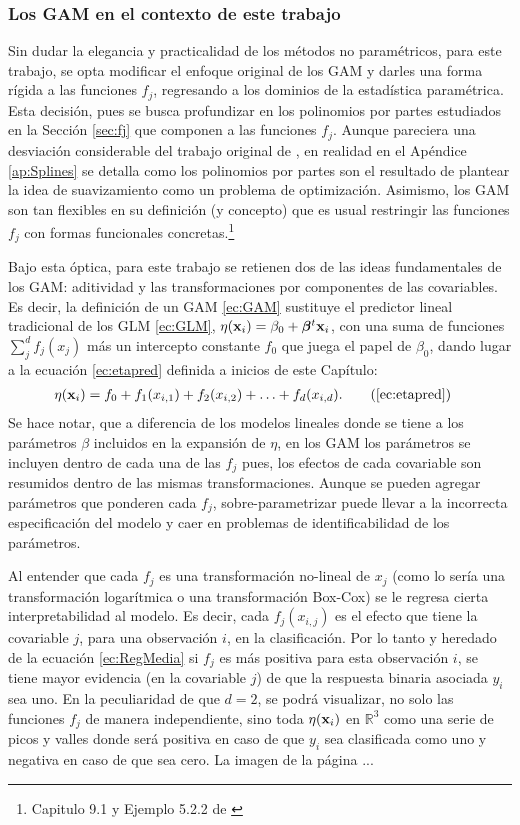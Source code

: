 \documentclass[../Main/Main.tex]{subfiles}
\begin{document}
\subsubsection*{Los GAM en el contexto de este trabajo}
Sin dudar la elegancia y practicalidad de los métodos no paramétricos, para este trabajo, se opta modificar el enfoque original de los GAM y darles una forma rígida a las funciones $f_j$, regresando a los dominios de la estadística paramétrica. Esta decisión, pues se busca profundizar en los polinomios por partes estudiados en la Sección \ref{sec:fj} que componen a las funciones $f_j$. Aunque pareciera una desviación considerable del trabajo original de \citeauthor{hastie1990generalized}, en realidad en el Apéndice \ref{ap:Splines} se detalla como los polinomios por partes son el resultado de plantear la idea de suavizamiento como un problema de optimización. Asimismo, los GAM son tan flexibles en su definición (y concepto) que es usual restringir las funciones $f_j$ con formas funcionales concretas.\footnote{Capitulo 9.1 y Ejemplo 5.2.2 de \citet{hastie2008elements}}

Bajo esta óptica, para este trabajo se retienen dos de las ideas fundamentales de los GAM: aditividad y las transformaciones por componentes de las covariables. Es decir, la definición de un GAM \eqref{ec:GAM} sustituye el predictor lineal tradicional de los GLM \eqref{ec:GLM}, $\eta(\mathbf{x}_i) = \beta_0 + \bm{\beta}^t\mathbf{x}_i$, con una suma de funciones $\sum_j^d f_j(x_j)$ más un intercepto constante $f_0$ que juega el papel de $\beta_0$, dando lugar a la ecuación \eqref{ec:etapred} definida a inicios de este Capítulo:
\begin{align}
\eta(\xni) &= f_0 + f_1(x_{i,1}) + f_2(x_{i,2}) + \ldots + f_d(x_{i,d}). \tag{\ref{ec:etapred}}
\end{align}
Se hace notar, que a diferencia de los modelos lineales donde se tiene a los parámetros $\beta$ incluidos en la expansión de $\eta$,  en los GAM los parámetros se incluyen dentro de cada una de las $f_j$ pues, los efectos de cada covariable son resumidos dentro de las mismas transformaciones. Aunque se pueden agregar parámetros que ponderen cada $f_j$, sobre-parametrizar puede llevar a la incorrecta especificación del modelo y caer en problemas de identificabilidad de los parámetros.

Al entender que cada $f_j$ es una transformación no-lineal de $x_j$ (como lo sería una transformación logarítmica o una transformación Box-Cox) se le regresa cierta interpretabilidad al modelo. Es decir, cada $f_j(x_{i,j})$ es el efecto que tiene la covariable $j$, para una observación $i$, en la clasificación. Por lo tanto y heredado de la ecuación \eqref{ec:RegMedia} si $f_j$ es más positiva para esta observación $i$, se tiene mayor evidencia (en la covariable $j$) de que la respuesta binaria asociada $y_i$ sea uno. En la peculiaridad de que $d = 2$, se podrá visualizar, no solo las funciones $f_j$ de manera independiente, sino toda $\eta(\mathbf{x}_i)$ en $\mathbb{R}^3$ como una serie de picos y valles donde será positiva en caso de que $y_i $ sea clasificada como uno y  negativa en caso de que sea cero. La imagen de la página ...
\end{document}
